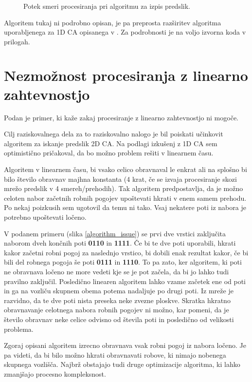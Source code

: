 \documentclass[12pt,a4paper,openany,twoside]{book}
\begin{document}
\begin{figure}[htb]
\centerline{}
\caption[Algoritem za izpis predslik.]{Potek smeri procesiranja pri algoritmu za izpis predslik.}
\label{algorithm_list}
\end{figure}

Algoritem tukaj ni podrobno opisan, je pa preprosta razširitev algoritma uporabljenega
za 1D CA opisanega v \cite{JerasDobnikar2007}. Za podrobnosti je na voljo izvorna koda v prilogah.

\section{Nezmožnost procesiranja z linearno zahtevnostjo}

Podan je primer, ki kaže zakaj procesiranje z linearno zahtevnostjo ni mogoče.

Cilj raziskovalnega dela za to raziskovalno nalogo je bil poiskati
učinkovit algoritem za iskanje predslik 2D CA. Na podlagi izkušenj z 1D CA
sem optimistično pričakoval, da bo možno problem rešiti v linearnem času.

Algoritem v linearnem času, bi vsako celico obravnaval le enkrat
ali na splošno bi bilo število obravnav majhna konstanta (4 krat,
če se izvaja procesiranje skozi mrežo predslik v 4 smereh/prehodih).
Tak algoritem predpostavlja, da je možno celoten nabor začetnih
robnih pogojev upoštevati hkrati v enem samem prehodu. Po nekaj
poizkusih sem ugotovil da temu ni tako. Vsaj nekatere poti iz nabora je
potrebno upoštevati ločeno.

V podanem primeru (slika \ref{algorithm_issue}) se prvi dve vrstici zaključita
naborom dveh končnih poti \textbf{0110} in \textbf{1111}. Če bi te dve poti
uporabili, hkrati kakor začetni robni pogoj za naslednjo vrstico, bi dobili
enak rezultat kakor, če bi bili del robnega pogoja še poti \textbf{0111} in \textbf{1110}.
To pa zato, ker algoritem, ki poti ne obravnava ločeno ne more vedeti
kje se je pot začela, da bi jo lahko tudi pravilno zaključil.
Posledično linearen algoritem lahko vzame začetek ene od poti in ga
na vozliču skupnem obema potema nadaljuje po drugi poti.
Iz mreže je razvidno, da te dve poti nista preseka neke zvezne ploskve.
Skratka hkratno obravnavanje celotnega nabora robnih pogojev ni možno,
kar pomeni, da je število obravnav neke celice odvisno od števila poti
in posledično od velikosti problema.

Zgoraj opisani algoritem izrecno obravnava vsak robni pogoj iz nabora ločeno.
Je pa videti, da bi bilo možno hkrati obravnavati robove, ki nimajo nobenega skupnega
vozlišča. Najbrž obstajajo tudi druge optimizacije algoritma, ki lahko zmanjšajo
procesno kompleksnost.
\end{document}
